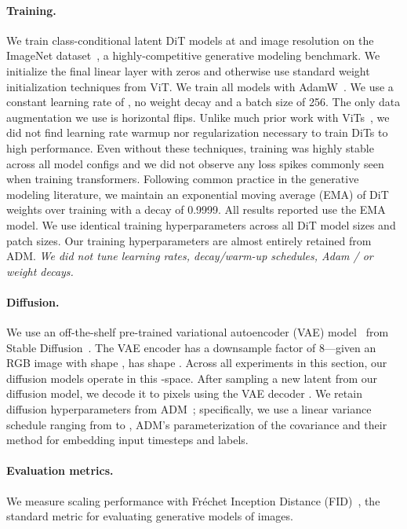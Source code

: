 \documentclass[10pt,twocolumn,letterpaper]{article}
\begin{document}
\paragraph{Training.} We train class-conditional latent DiT models at  and  image resolution on the ImageNet dataset~\cite{krizhevsky2012imagenet}, a highly-competitive generative modeling benchmark. We initialize the final linear layer with zeros and otherwise use standard weight initialization techniques from ViT. We train all models with AdamW~\cite{loshchilov2017decoupled,kingma2014adam}. We use a constant learning rate of , no weight decay and a batch size of 256. The only data augmentation we use is horizontal flips. Unlike much prior work with ViTs~\cite{steiner2021train,Xiao2021}, we did not find learning rate warmup nor regularization necessary to train DiTs to high performance. Even without these techniques, training was highly stable across all model configs and we did not observe any loss spikes commonly seen when training transformers. Following common practice in the generative modeling literature, we maintain an exponential moving average (EMA) of DiT weights over training with a decay of 0.9999. All results reported use the EMA model. We use identical training hyperparameters across all DiT model sizes and patch sizes. Our training hyperparameters are almost entirely retained from ADM. \emph{We did \textit{not} tune learning rates, decay/warm-up schedules, Adam / or weight decays.}
\vspace{-2mm}
\paragraph{Diffusion.} We use an off-the-shelf pre-trained variational autoencoder (VAE) model~\cite{kingma2013auto} from Stable Diffusion~\cite{rombach2021highresolution}. The VAE encoder has a downsample factor of 8---given an RGB image  with shape ,  has shape . Across all experiments in this section, our diffusion models operate in this -space. After sampling a new latent from our diffusion model, we decode it to pixels using the VAE decoder . We retain diffusion hyperparameters from ADM~\cite{dhariwal2021adm}; specifically, we use a  linear variance schedule ranging from  to , ADM's parameterization of the covariance  and their method for embedding input timesteps and labels.
\vspace{-6mm}
\paragraph{Evaluation metrics.} We measure scaling performance with Fréchet Inception Distance (FID)~\cite{heusel2017gans}, the standard metric for evaluating generative models of images. 
\end{document}
